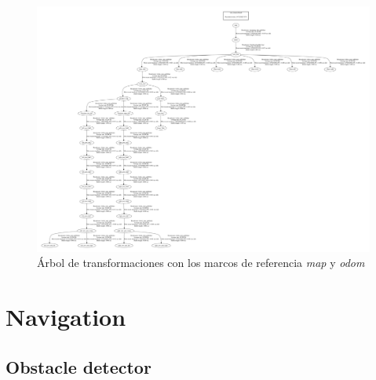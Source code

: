\documentclass[user_manual.tex]{subfiles}
\begin{document}
\begin{figure}[H]
\begin{center}
\includegraphics[scale=0.2, angle=90]{Figures/Software/kinematic_tree/frames.pdf}
\end{center}
\caption{Árbol de transformaciones con los marcos de referencia \textit{map} y \textit{odom}}
\label{fig:URDF:Frames}
\end{figure}

\section{Navigation}

\subsection{Obstacle detector}
\end{document}
